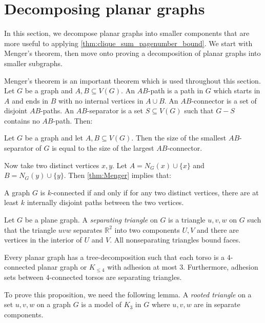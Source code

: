 \section{Decomposing planar graphs}
In this section, we decompose planar graphs into smaller components that are more useful to applying \cref{thm:clique_sum_pagenumber_bound}. We start with Menger's theorem, then move onto proving a decomposition of planar graphs into smaller subgraphs. 

Menger's theorem \cite{mengerZurAllgemeinenKurventheorie1927} is an important theorem which is used throughout this section. 
Let \(G\) be a graph and \(A, B \subseteq V(G)\). An \(AB\)-path is a path in \(G\) which starts in \(A\) and ends in \(B\) with no internal vertices in \(A \cup B\). An \(AB\)-connector is a set of disjoint \(AB\)-paths. An \(AB\)-separator is a set \(S \subseteq V(G)\) such that \(G - S\) contains no \(AB\)-path. Then:
\begin{theorem}\label{thm:Menger}
	Let $G$ be a graph and let $A, B \subseteq V(G)$. Then the size of the smallest \(AB\)-separator of \(G\) is equal to the size of the largest \(AB\)-connector.
\end{theorem}
Now take two distinct vertices \(x, y\). Let \(A = N_G(x) \cup \{x\} \) and \(B = N_G(y) \cup \{y\} \). Then \cref{thm:Menger} implies that:
\begin{theorem}\label{thm:Menger_Vertex}
	A graph \(G\) is \(k\)-connected if and only if for any two distinct vertices, there are at least \(k\) internally disjoint paths between the two vertices.
\end{theorem}

Let $G$ be a plane graph. A \textit{separating triangle} on $G$ is a triangle $u,v,w$ on $G$ such that the triangle $uvw$ separates $\mathbb{R}^2$ into two components $U, V$ and there are vertices in the interior of $U$ and $V$. All nonseparating triangles bound faces. 

\begin{proposition}\label{lem:planar_graphs_4_connected_cliqesums}
	Every planar graph has a tree-decomposition such that each torso is a \(4\)-connected planar graph or $K_{\leq 4}$ with adhesion at most \(3\). Furthermore, adhesion sets between $4$-connected torsos are separating triangles.
\end{proposition}

To prove this proposition, we need the following lemma. A \textit{rooted triangle} on a set $u, v, w$ on a graph $G$ is a model of $K_3$ in $G$ where $u, v, w$ are in separate components. 

